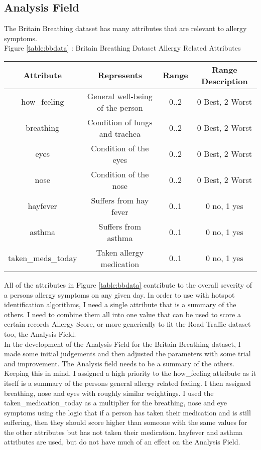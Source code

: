 \subsection{Analysis Field}

The Britain Breathing dataset has many attributes that are relevant to allergy symptoms.\\

Figure \ref{table:bbdata} : Britain Breathing Dataset Allergy Related Attributes\\\label{table:bbdata}
\begin{tabular}{|c|c|c|c|}\hline\hline
Attribute&Represents&Range&Range Description\\\hline
how\_feeling&General well-being of the person&0..2&0 Best, 2 Worst\\
breathing&Condition of lungs and trachea&0..2&0 Best, 2 Worst\\
eyes&Condition of the eyes&0..2&0 Best, 2 Worst\\
nose&Condition of the nose&0..2&0 Best, 2 Worst\\
hayfever&Suffers from hay fever&0..1&0 no, 1 yes\\
asthma&Suffers from asthma&0..1&0 no, 1 yes\\
taken\_meds\_today&Taken allergy medication&0..1&0 no, 1 yes\\\hline\hline
\end{tabular}

All of the attributes in Figure \ref{table:bbdata} contribute to the overall severity of a persons allergy symptoms on any given day. In order to use with hotspot identification algorithms, I need a single attribute that is a summary of the others. I need to combine them all into one value that can be used to score a certain records Allergy Score, or more generically to fit the Road Traffic dataset too, the Analysis Field.\\

In the development of the Analysis Field for the Britain Breathing dataset, I made some initial judgements and then adjusted the parameters with some trial and improvement. The Analysis field needs to be a summary of the others. Keeping this in mind, I assigned a high priority to the how\_feeling attribute as it itself is a summary of the persons general allergy related feeling. I then assigned breathing, nose and eyes with roughly similar weightings. I used the taken\_medication\_today as a multiplier for the breathing, nose and eye symptoms using the logic that if a person has taken their medication and is still suffering, then they should score higher than someone with the same values for the other attributes but has not taken their medication. hayfever and asthma attributes are used, but do not have much of an effect on the Analysis Field.\\

